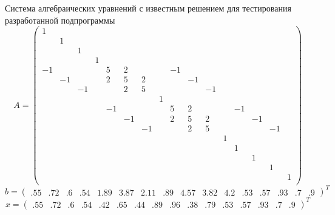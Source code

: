 Система алгебраических уравнений с известным решением для тестирования разработанной подпрограммы
\[ A = \begin{pmatrix}
  1 &   &   &   &   &   &   &   &   &   &   &   &   &   &   &  \\
    & 1 &   &   &   &   &   &   &   &   &   &   &   &   &   &  \\
    &   & 1 &   &   &   &   &   &   &   &   &   &   &   &   &  \\
    &   &   & 1 &   &   &   &   &   &   &   &   &   &   &   &  \\
  -1 &   &   &   & 5 & 2 &   &   & -1 &   &   &   &   &   &   &  \\
    & -1 &   &   & 2 & 5 & 2 &   &   & -1 &   &   &   &   &   &  \\
    &   & -1 &   &   & 2 & 5 &   &   &   & -1 &   &   &   &   &  \\
    &   &   &   &   &   &   & 1 &   &   &   &   &   &   &   &  \\
    &   &   &   & -1 &   &   &   & 5 & 2 &   &   & -1 &   &   &  \\
    &   &   &   &   & -1 &   &   & 2 & 5 & 2 &   &   & -1 &   &  \\
    &   &   &   &   &   & -1 &   &   & 2 & 5 &   &   &   & -1 &  \\
    &   &   &   &   &   &   &   &   &   &   & 1 &   &   &   &  \\
    &   &   &   &   &   &   &   &   &   &   &   & 1 &   &   &  \\
    &   &   &   &   &   &   &   &   &   &   &   &   & 1 &   &  \\
    &   &   &   &   &   &   &   &   &   &   &   &   &   & 1 &  \\
    &   &   &   &   &   &   &   &   &   &   &   &   &   &   & 1\\
\end{pmatrix} \]
\[ b = \begin{pmatrix}
   .55 &  .72 &  .6 &  .54 & 1.89 & 3.87 & 2.11 &  .89 & 4.57 & 3.82 & 4.2 &  .53 &  .57 &  .93 &
   . 7 &  . 9
\end{pmatrix}^{T} \]
\[ x = \begin{pmatrix}
   .55 &  .72 &  .6 &  .54 &  .42 &  .65 &  .44 &  .89 &  .96 &  .38 &  .79 &  .53 &  .57 &  .93 &
   . 7 &  . 9
\end{pmatrix}^{T} \]
